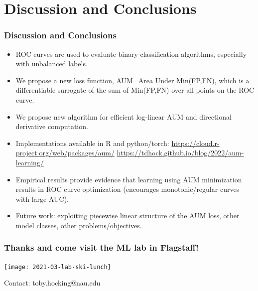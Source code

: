 \documentclass[t]{beamer}
\begin{document}
\section{Discussion and Conclusions}

\begin{frame}
  \frametitle{Discussion and Conclusions}
  \begin{itemize}
  \item ROC curves are used to evaluate binary classification
    algorithms, especially with unbalanced labels.  
  \item We propose a new loss function, AUM=Area Under Min(FP,FN),
    which is a differentiable surrogate of the sum of Min(FP,FN) over
    all points on the ROC curve.
  \item We propose new algorithm for efficient log-linear AUM and directional
    derivative computation.
  \item Implementations available in R and python/torch:
    \url{https://cloud.r-project.org/web/packages/aum/}
    \url{https://tdhock.github.io/blog/2022/aum-learning/}
  \item Empirical results provide evidence that learning using AUM
    minimization results in ROC curve optimization (encourages
    monotonic/regular curves with large AUC).
  \item Future work: exploiting piecewise linear structure of the AUM
    loss, other model classes, other problems/objectives.
  \end{itemize}
\end{frame}

\begin{frame}
  \frametitle{Thanks and come visit the ML lab in Flagstaff!}

  \texttt{[image: 2021-03-lab-ski-lunch]} 

  Contact: toby.hocking@nau.edu

\end{frame} 
\end{document}
